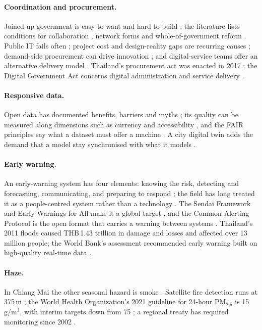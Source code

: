 \documentclass[10pt,twocolumn,a4paper]{article}
\begin{document}
\paragraph{Coordination and procurement.}
Joined-up government is easy to want and hard to build \citep{pollitt2003,bardach1998}; the literature lists conditions for collaboration \citep{bryson2006,ansell2008}, network forms \citep{provan2008} and whole-of-government reform \citep{christensen2007}. Public IT fails often \citep{goldfinch2007,anthopoulos2016}; project cost and design-reality gaps are recurring causes \citep{flyvbjerg2013,heeks2006}; demand-side procurement can drive innovation \citep{edler2007}; and digital-service teams offer an alternative delivery model \citep{mergel2019,pahlka2023}. Thailand's procurement act was enacted in 2017 \citep{thailand2017procurementact}; the Digital Government Act concerns digital administration and service delivery \citep{thailand2019digitalact}.

\paragraph{Responsive data.}
Open data has documented benefits, barriers and myths \citep{janssen2012open}; its quality can be measured along dimensions such as currency and accessibility \citep{vetro2016,zaveri2016}, and the FAIR principles say what a dataset must offer a machine \citep{wilkinson2016}. A city digital twin adds the demand that a model stay synchronised with what it models \citep{batty2018,bolton2018gemini}.

\paragraph{Early warning.}
An early-warning system has four elements: knowing the risk, detecting and forecasting, communicating, and preparing to respond \citep{wmo2018mhews}; the field has long treated it as a people-centred system rather than a technology \citep{basher2006,sorensen2000}. The Sendai Framework and Early Warnings for All make it a global target \citep{unga2015sendai,wmo2023ew4all}, and the Common Alerting Protocol is the open format that carries a warning between systems \citep{oasis2010cap}. Thailand's 2011 floods caused THB\,1.43 trillion in damage and losses and affected over 13 million people; the World Bank's assessment recommended early warning built on high-quality real-time data \citep{worldbank2012thaiflood}.

\paragraph{Haze.}
In Chiang Mai the other seasonal hazard is smoke \citep{chantara2012,inlaung2022}. Satellite fire detection runs at 375\,m \citep{schroeder2014}; the World Health Organization's 2021 guideline for 24-hour PM$_{2.5}$ is 15\,\textmu g/m$^3$, with interim targets down from 75 \citep{who2021aqg}; a regional treaty has required monitoring since 2002 \citep{asean2002haze}.
\end{document}
